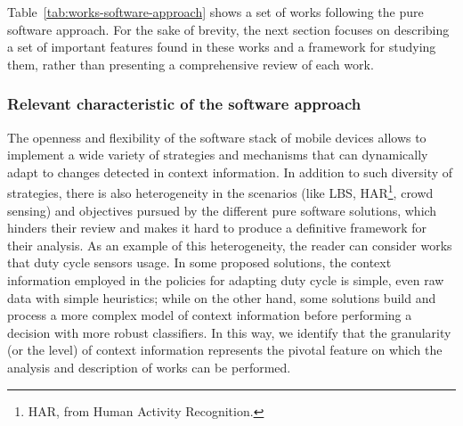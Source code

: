 \documentclass[ENG,PhD]{cinvestav}
\begin{document}
Table~\ref{tab:works-software-approach} shows a set of works following the pure software approach.
For the sake of brevity, the next section focuses on describing a set of important features found in these works and a framework for studying them, rather than presenting a comprehensive review of each work.

\subsubsection{Relevant characteristic of the software approach}
The openness and flexibility of the software stack of mobile devices allows to implement a wide variety of strategies and mechanisms that can dynamically adapt to changes detected in context information.
In addition to such diversity of strategies, there is also heterogeneity in the scenarios (like LBS, HAR\footnote{HAR, from Human Activity Recognition.}, crowd sensing) and objectives pursued by the different pure software solutions, which hinders their review and makes it hard to produce a definitive framework for their analysis.
As an example of this heterogeneity, the reader can consider works that duty cycle sensors usage.
In some proposed solutions, the context information employed in the policies for adapting duty cycle is simple, even raw data with simple heuristics; while on the other hand, some solutions build and process a more complex model of context information before performing a decision with more robust classifiers.
In this way, we identify that the granularity (or the level) of context information represents the pivotal feature on which the analysis and description of works can be performed.
\end{document}
